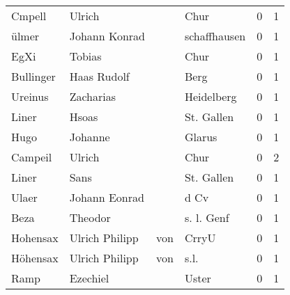 \begin{tabular}{llllrr}
                   Cmpell &                             Ulrich &             &                                        Chur &          0 &         1 \\
                    ülmer &                      Johann Konrad &             &                                schaffhausen &          0 &         1 \\
                     EgXi &                             Tobias &             &                                        Chur &          0 &         1 \\
                Bullinger &                        Haas Rudolf &             &                                        Berg &          0 &         1 \\
                  Ureinus &                          Zacharias &             &                                  Heidelberg &          0 &         1 \\
                    Liner &                              Hsoas &             &                                  St. Gallen &          0 &         1 \\
                     Hugo &                            Johanne &             &                                      Glarus &          0 &         1 \\
                  Campeil &                             Ulrich &             &                                        Chur &          0 &         2 \\
                    Liner &                               Sans &             &                                  St. Gallen &          0 &         1 \\
                    Ulaer &                      Johann Eonrad &             &                                        d Cv &          0 &         1 \\
                     Beza &                            Theodor &             &                                  s. l. Genf &          0 &         1 \\
                 Hohensax &                     Ulrich Philipp &         von &                                       CrryU &          0 &         1 \\
                 Höhensax &                     Ulrich Philipp &         von &                                        s.l. &          0 &         1 \\
                     Ramp &                           Ezechiel &             &                                       Uster &          0 &         1 \\

\end{tabular}

